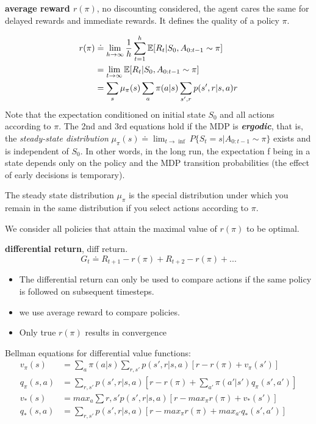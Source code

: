 \documentclass[sutton_barto_notes.tex]{subfiles}
\begin{document}
\begin{definition}
\textbf{average reward $r(\pi)$}, no discounting considered, the agent cares the same for delayed rewards and immediate rewards. It defines the quality of a policy $\pi$.
\end{definition}
\begin{align*}
r(\pi)&\doteq \lim_{h\to\infty} \frac{1}{h} \sum_{t=1}^h \operatorname*{\mathbb{E}}[R_t|S_0, A_{0:t-1} \sim \pi]\\
&=\lim_{t\to\infty}\operatorname*{\mathbb{E}}[R_t|S_0, A_{0:t-1} \sim \pi]\\
&=\sum_s \mu_\pi(s) \sum_a \pi(a|s) \sum_{s',r} p(s',r|s,a)r
\end{align*}
Note that the expectation conditioned on initial state $S_0$ and all actions according to $\pi$. The 2nd and 3rd equations hold if the MDP is \textbf{\textit{ergodic}}, that is, the \textit{steady-state distribution} $\mu_\pi(s)\doteq \lim_{t\rightarrow\inf}P\{S_t=s|A_{0:t-1}\sim\pi\}$ exists and is independent of $S_0$.
In other words, in the long run, the expectation f being in a state depends only on the policy and the MDP transition probabilities (the effect of early decisions is temporary).

The steady state distribution $\mu_\pi$ is the special distribution under which you remain in the same distribution if you select actions according to $\pi$.

We consider all policies that attain the maximal value of $r(\pi)$ to be optimal.

\begin{definition}
\textbf{differential return}, diff return.
$$G_t \doteq R_{t+1} - r(\pi) + R_{t+2} - r(\pi) + ...$$
\end{definition}
\begin{itemize}
\item The differential return can only be used to compare actions if the same policy is followed on subsequent timesteps.
\item we use average reward to compare policies.
\item Only true $r(\pi)$ results in convergence
\end{itemize}

Bellman equations for differential value functions:
\begin{align*}
v_\pi(s) &= \sum_a \pi(a|s)\sum_{r,s'}p(s',r|s,a)[r-r(\pi)+v_\pi(s')]\\
q_\pi(s,a)&=\sum_{r,s'}p(s',r|s,a)[r-r(\pi)+\sum_{a'}\pi(a'|s')q_\pi(s',a')]\\
v_*(s)&= max_a \sum{r,s'}p(s',r|s,a)[r-max_\pi r(\pi) + v_*(s')]\\
q_*(s,a) &= \sum_{r,s'}p(s',r|s,a)[r-max_\pi r(\pi) + max_{a'} q_*(s',a')]
\end{align*}
\end{document}
